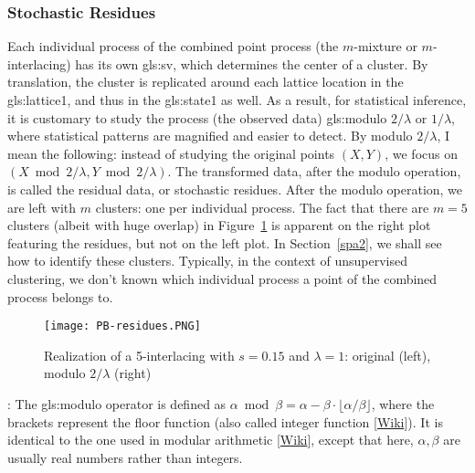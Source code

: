 \documentclass[10pt]{article}
\begin{document}
\subsubsection{Stochastic Residues} \label{sr40}

Each individual process of the  combined point process (the $m$-mixture or $m$-interlacing) has its own
\gls{gls:sv}, which determines the center of a cluster. By translation, the cluster is replicated around each lattice location
in the \gls{gls:lattice1}, and thus in the \gls{gls:state1} as well. As a result, for statistical inference, it is customary to study the
process (the observed data) \gls{gls:modulo} $2/\lambda$ or $1/\lambda$, where statistical patterns are magnified and easier to detect. By modulo $2/\lambda$, I mean the following:  instead of
studying the original points $(X,Y)$, we focus on $(X\bmod 2/\lambda,Y\bmod 2/\lambda)$. The transformed data, after the modulo operation, is called the residual data, or
\textcolor{index}{stochastic residues}.
After the modulo operation, we are left with $m$ clusters: one per individual process.  The fact that there are $m=5$ clusters (albeit with huge overlap) in Figure~\ref{fig:residues} is apparent on the right plot featuring the residues, but not on the left plot. In Section~\ref{spa2}, we shall see how to identify these clusters. Typically, in the context of unsupervised clustering, we don't known which individual process a point of the combined process belongs to.

\begin{figure}%
\centering
\texttt{[image: PB-residues.PNG]}
\caption{Realization of a 5-interlacing with $s=0.15$ and $\lambda=1$: original (left), modulo $2/\lambda$ (right)}
\label{fig:residues}
\end{figure}

: The \gls{gls:modulo} operator is defined as  $\alpha \bmod{\beta} =\alpha-\beta \cdot \lfloor \alpha/\beta\rfloor$,
where the brackets represent the floor function (also called integer function [\href{https://en.wikipedia.org/wiki/Floor_and_ceiling_functions}{Wiki}]). It is identical to the one used in modular arithmetic [\href{https://en.wikipedia.org/wiki/Modular_arithmetic}{Wiki}], except that here, $\alpha,\beta$ are usually real numbers rather than integers.
\end{document}
